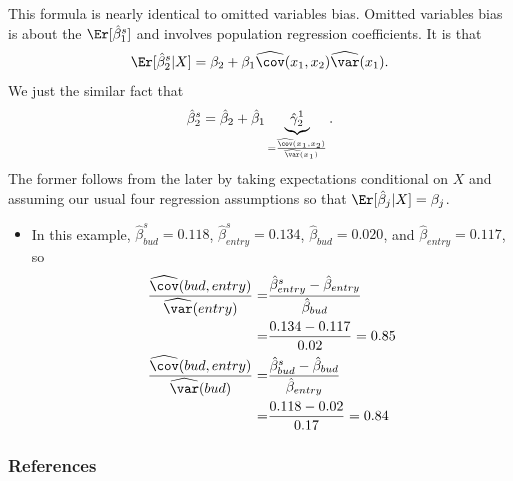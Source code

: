 This formula is nearly identical to omitted variables bias. Omitted
variables bias is about the $\Er[\hat{\beta}_1^s]$ and involves
population regression coefficients. It is that  
\[
\Er[\hat{\beta}_2^s|X] = \beta_2 + \beta_1
{\widehat{\cov}(x_1,x_2)}{\widehat{\var}(x_1)}.
\]
We just the similar fact that 
\[
\hat{\beta}_2^s = \hat{\beta}_2 + \hat{\beta}_1
\underbrace{\hat{\gamma}_2^1}_{ =\frac{\widehat{\cov}(x_1,x_2)}
  {\widehat{\var}(x_1)}}.
\]
The former follows from the later by taking expectations conditional
on $X$ and assuming our usual four regression assumptions so that
$\Er[\hat{\beta}_j|X] = \beta_j$.

\begin{frame}
  \begin{itemize}
  \item In this example, $\hat{\beta}_{bud}^s = 0.118$,
    $\hat{\beta}_{entry}^s = 0.134$, $\hat{\beta}_{bud} = 0.020$, and
    $\hat{\beta}_{entry} = 0.117$, so
    \begin{align*}
      \frac{\widehat{\cov}(bud,entry)}
      {\widehat{\var}(entry)} = & \frac{\hat{\beta}_{entry}^s -
        \hat{\beta}_{entry}} {\hat{\beta}_{bud}} \\
      = & \frac{0.134 - 0.117}{0.02} = 0.85 \\
      \frac{\widehat{\cov}(bud,entry)}
      {\widehat{\var}(bud)} = & \frac{\hat{\beta}_{bud}^s -
        \hat{\beta}_{bud}}{\hat{\beta}_{entry}} \\
      = & \frac{0.118 - 0.02}{0.17} = 0.84 
    \end{align*}          
  \end{itemize}

\end{frame}

\begin{frame}[allowframebreaks]
  \frametitle{References}


\end{frame}
  

